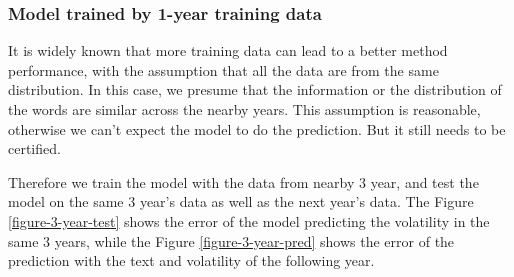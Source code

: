 \documentclass[11pt]{article}
\begin{document}
\subsubsection{Model trained by 1-year training data}

It is widely known that more training data can lead to a better method performance, with the assumption that all the data are from the same distribution. In this case, we presume that the information or the distribution of the words are similar across the nearby years. This assumption is reasonable, otherwise we can't expect the model to do the prediction. But it still needs to be certified.

Therefore we train the model with the data from nearby 3 year, and test the model on the same 3 year's data as well as the next year's data. The Figure \ref{figure-3-year-test} shows the error of the model predicting the volatility in the same 3 years, while the Figure \ref{figure-3-year-pred} shows the error of the prediction with the text and volatility of the following year.
\end{document}

